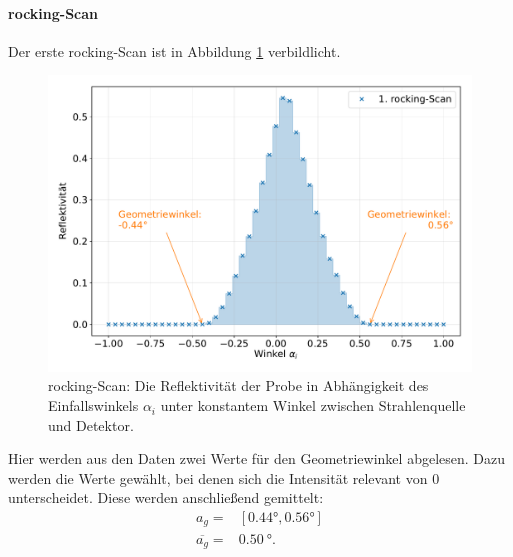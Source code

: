 \FloatBarrier
\paragraph{rocking-Scan}
Der erste rocking-Scan ist in Abbildung \ref{fig:rock} verbildlicht.
\begin{figure}[H]
  \centering
  \includegraphics[width=\textwidth]{content/images/done_plot_rockingscan.pdf}
  \caption{rocking-Scan: Die Reflektivität der Probe in Abhängigkeit des Einfallswinkels $\alpha_i$ unter konstantem Winkel zwischen Strahlenquelle und Detektor.}
  \label{fig:rock}
\end{figure}
Hier werden aus den Daten zwei Werte für den Geometriewinkel abgelesen.
Dazu werden die Werte gewählt, bei denen sich die Intensität relevant von 0 unterscheidet.
Diese werden anschließend gemittelt:
\begin{align*}
	a_g 			= & [0.44°, 0.56°] \\
	\overline{a_g}	= & \SI{0.50}{°}. \\
\end{align*}

